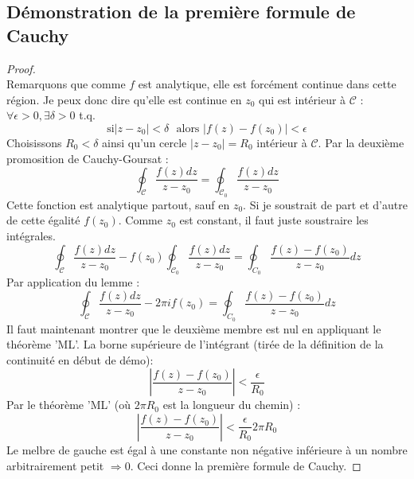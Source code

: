 \subsection{Démonstration de la première formule de Cauchy}
\begin{proof}\ \\
	Remarquons que comme $f$ est analytique, elle est forcément continue dans cette région. Je 
	peux donc dire qu'elle est continue en $z_0$ qui est intérieur à $\mathcal{C}$ : $\forall
	\epsilon > 0, \exists \delta > 0$ t.q. 
	\begin{equation}
		\text{si} |z-z_0| < \delta\ \ \ \text{alors } |f(z)-f(z_0)| < \epsilon
	\end{equation}
	Choisissons $R_0 < \delta$ ainsi qu'un cercle $|z-z_0| = R_0$ intérieur à $\mathcal{C}$. Par
	la deuxième promosition de Cauchy-Goursat :
	\begin{equation}
		\oint_\mathcal{C} \dfrac{f(z) dz}{z-z_0} = \oint_\mathcal{C_0} \dfrac{f(z) dz}{z-z_0}
	\end{equation}
	Cette fonction est analytique partout, sauf en $z_0$. Si je soustrait de part et d'autre 
	de cette égalité $f(z_0)$. Comme $z_0$ est constant, il faut juste soustraire les intégrales.
	\begin{equation}
		\oint_\mathcal{C} \dfrac{f(z) dz}{z-z_0} -f(z_0)\oint_\mathcal{C_0} \dfrac{f(z) dz}{z-z_0} 
		= \oint_{C_0} \dfrac{f(z)-f(z_0)}{z-z_0}dz
	\end{equation}
	Par application du lemme :
	\begin{equation}
		\oint_\mathcal{C} \dfrac{f(z) dz}{z-z_0} - 2\pi i f(z_0) 
		= \oint_{C_0} \dfrac{f(z)-f(z_0)}{z-z_0}dz
	\end{equation}
	Il faut maintenant montrer que le deuxième membre est nul en appliquant le théorème 'ML'. La
	borne supérieure de l'intégrant (tirée de la définition de la continuité en début de démo):
	\begin{equation}
		\left|\dfrac{f(z) - f(z_0)}{z-z_0}\right| < \dfrac{\epsilon}{R_0}
	\end{equation}
	Par le théorème 'ML' (où $2\pi R_0$ est la longueur du chemin) :
	\begin{equation}
		\left|\dfrac{f(z) - f(z_0)}{z-z_0}\right| < \dfrac{\epsilon}{R_0}2\pi R_0
	\end{equation}
	Le melbre de gauche est égal à une constante non négative inférieure à un nombre arbitrairement
	petit $\Rightarrow 0$. Ceci donne la première formule de Cauchy.
\end{proof}
    
